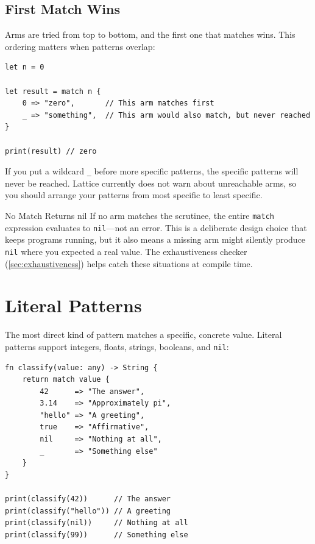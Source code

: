 \subsection{First Match Wins}\label{sec:first-match-wins}

Arms are tried from top to bottom, and the first one that matches wins. This ordering matters when patterns overlap:

\begin{lstlisting}[language=Lattice, caption={Order matters---first match wins}]
let n = 0

let result = match n {
    0 => "zero",       // This arm matches first
    _ => "something",  // This arm would also match, but never reached
}

print(result) // zero
\end{lstlisting}

If you put a wildcard \lstinline|_| before more specific patterns, the specific patterns will never be reached. Lattice currently does not warn about unreachable arms, so you should arrange your patterns from most specific to least specific.

\begin{warnbox}{No Match Returns nil}
If no arm matches the scrutinee, the entire \lstinline|match| expression evaluates to \lstinline|nil|---not an error. This is a deliberate design choice that keeps programs running, but it also means a missing arm might silently produce \lstinline|nil| where you expected a real value. The exhaustiveness checker (\cref{sec:exhaustiveness}) helps catch these situations at compile time.
\end{warnbox}

\section{Literal Patterns}\label{sec:literal-patterns}

The most direct kind of pattern matches a specific, concrete value. Literal patterns support integers, floats, strings, booleans, and \lstinline|nil|:

\begin{lstlisting}[language=Lattice, caption={Literal patterns across types}]
fn classify(value: any) -> String {
    return match value {
        42      => "The answer",
        3.14    => "Approximately pi",
        "hello" => "A greeting",
        true    => "Affirmative",
        nil     => "Nothing at all",
        _       => "Something else"
    }
}

print(classify(42))      // The answer
print(classify("hello")) // A greeting
print(classify(nil))     // Nothing at all
print(classify(99))      // Something else
\end{lstlisting}

